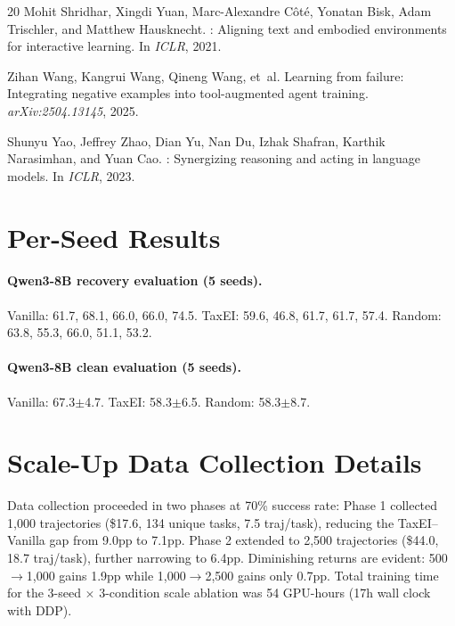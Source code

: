 \documentclass[11pt]{article}
\begin{document}
\begin{thebibliography}{20}
Mohit Shridhar, Xingdi Yuan, Marc-Alexandre C{\^o}t{\'e}, Yonatan Bisk, Adam Trischler, and Matthew Hausknecht.
: Aligning text and embodied environments for interactive learning.
\newblock In \emph{ICLR}, 2021.

Zihan Wang, Kangrui Wang, Qineng Wang, et~al.
\newblock Learning from failure: Integrating negative examples into tool-augmented agent training.
\newblock \emph{arXiv:2504.13145}, 2025.

Shunyu Yao, Jeffrey Zhao, Dian Yu, Nan Du, Izhak Shafran, Karthik Narasimhan, and Yuan Cao.
: Synergizing reasoning and acting in language models.
\newblock In \emph{ICLR}, 2023.

\end{thebibliography}

\appendix
\section{Per-Seed Results}

\paragraph{Qwen3-8B recovery evaluation (5 seeds).}
Vanilla: 61.7, 68.1, 66.0, 66.0, 74.5.
TaxEI: 59.6, 46.8, 61.7, 61.7, 57.4.
Random: 63.8, 55.3, 66.0, 51.1, 53.2.

\paragraph{Qwen3-8B clean evaluation (5 seeds).}
Vanilla: 67.3$\pm$4.7.
TaxEI: 58.3$\pm$6.5.
Random: 58.3$\pm$8.7.

\section{Scale-Up Data Collection Details}

Data collection proceeded in two phases at 70\% success rate:
Phase 1 collected 1,000 trajectories (\$17.6, 134 unique tasks, 7.5 traj/task), reducing the TaxEI--Vanilla gap from 9.0pp to 7.1pp.
Phase 2 extended to 2,500 trajectories (\$44.0, 18.7 traj/task), further narrowing to 6.4pp.
Diminishing returns are evident: 500$\to$1,000 gains 1.9pp while 1,000$\to$2,500 gains only 0.7pp.
Total training time for the 3-seed $\times$ 3-condition scale ablation was 54 GPU-hours (17h wall clock with DDP).
\end{document}
